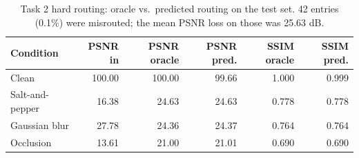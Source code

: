 \begin{table}[t]
\centering
\caption{Task 2 hard routing: oracle vs.\ predicted routing on the test set. 42 entries (0.1\%) were misrouted; the mean PSNR loss on those was 25.63 dB.}
\label{tab:t2_route}
\footnotesize
\begin{tabular}{lrrrrr}
\toprule
Condition & PSNR in & PSNR oracle & PSNR pred. & SSIM oracle & SSIM pred. \\
\midrule
Clean & 100.00 & 100.00 & 99.66 & 1.000 & 0.999 \\
Salt-and-pepper & 16.38 & 24.63 & 24.63 & 0.778 & 0.778 \\
Gaussian blur & 27.78 & 24.36 & 24.37 & 0.764 & 0.764 \\
Occlusion & 13.61 & 21.00 & 21.01 & 0.690 & 0.690 \\
\bottomrule
\end{tabular}
\end{table}
